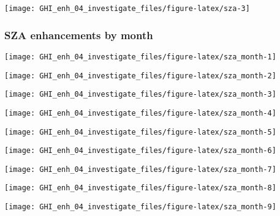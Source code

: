 \documentclass[
  10pt,
  a4paper,oneside]{article}
\begin{document}
\begin{center}\texttt{[image: GHI\_enh\_04\_investigate\_files/figure-latex/sza-3]} \end{center}

\newpage
\FloatBarrier

\hypertarget{sza-enhancements-by-month}{%
\subsubsection{SZA enhancements by month}\label{sza-enhancements-by-month}}

\begin{center}\texttt{[image: GHI\_enh\_04\_investigate\_files/figure-latex/sza\_month-1]} \end{center}

\begin{center}\texttt{[image: GHI\_enh\_04\_investigate\_files/figure-latex/sza\_month-2]} \end{center}

\begin{center}\texttt{[image: GHI\_enh\_04\_investigate\_files/figure-latex/sza\_month-3]} \end{center}

\begin{center}\texttt{[image: GHI\_enh\_04\_investigate\_files/figure-latex/sza\_month-4]} \end{center}

\begin{center}\texttt{[image: GHI\_enh\_04\_investigate\_files/figure-latex/sza\_month-5]} \end{center}

\begin{center}\texttt{[image: GHI\_enh\_04\_investigate\_files/figure-latex/sza\_month-6]} \end{center}

\begin{center}\texttt{[image: GHI\_enh\_04\_investigate\_files/figure-latex/sza\_month-7]} \end{center}

\begin{center}\texttt{[image: GHI\_enh\_04\_investigate\_files/figure-latex/sza\_month-8]} \end{center}

\begin{center}\texttt{[image: GHI\_enh\_04\_investigate\_files/figure-latex/sza\_month-9]} \end{center}
\end{document}
